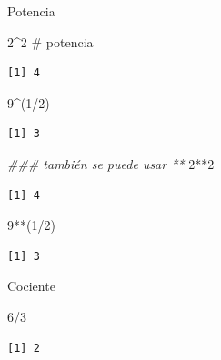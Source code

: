 \documentclass[
  ignorenonframetext,
  aspectratio=169,
  spanish,
]{beamer}
\newenvironment{Shaded}{\begin{snugshade}}{\end{snugshade}}
\newcommand{\CommentTok}[1]{\textcolor[rgb]{0.37,0.37,0.37}{#1}}
\newcommand{\DecValTok}[1]{\textcolor[rgb]{0.68,0.00,0.00}{#1}}
\newcommand{\DocumentationTok}[1]{\textcolor[rgb]{0.37,0.37,0.37}{\textit{#1}}}
\newcommand{\NormalTok}[1]{\textcolor[rgb]{0.00,0.23,0.31}{#1}}
\newcommand{\SpecialCharTok}[1]{\textcolor[rgb]{0.37,0.37,0.37}{#1}}
\begin{document}
\begin{frame}[fragile]{Potencia}
\label{potencia}
\begin{Shaded}
\begin{Highlighting}[]
\DecValTok{2}\SpecialCharTok{\^{}}\DecValTok{2} \CommentTok{\# potencia  }
\end{Highlighting}
\end{Shaded}

\begin{verbatim}
[1] 4
\end{verbatim}

\begin{Shaded}
\begin{Highlighting}[]
\DecValTok{9}\SpecialCharTok{\^{}}\NormalTok{(}\DecValTok{1}\SpecialCharTok{/}\DecValTok{2}\NormalTok{) }
\end{Highlighting}
\end{Shaded}

\begin{verbatim}
[1] 3
\end{verbatim}

\begin{Shaded}
\begin{Highlighting}[]
\DocumentationTok{\#\#\# también se puede usar **}
\DecValTok{2}\SpecialCharTok{**}\DecValTok{2}
\end{Highlighting}
\end{Shaded}

\begin{verbatim}
[1] 4
\end{verbatim}

\begin{Shaded}
\begin{Highlighting}[]
\DecValTok{9}\SpecialCharTok{**}\NormalTok{(}\DecValTok{1}\SpecialCharTok{/}\DecValTok{2}\NormalTok{)}
\end{Highlighting}
\end{Shaded}

\begin{verbatim}
[1] 3
\end{verbatim}
\end{frame}

\begin{frame}[fragile]{Cociente}
\label{cociente}
\begin{Shaded}
\begin{Highlighting}[]
\DecValTok{6}\SpecialCharTok{/}\DecValTok{3}
\end{Highlighting}
\end{Shaded}

\begin{verbatim}
[1] 2
\end{verbatim}
\end{frame}
\end{document}

